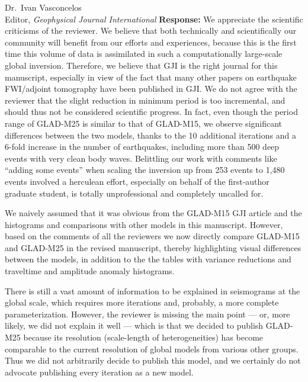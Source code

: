 \documentclass[11pt,a4paper]{letter}
\newcommand{\response}[1]{\textbf{Response:} #1}
\begin{document}
\begin{letter}{Dr.~Ivan Vasconcelos\\
Editor, \textit{Geophysical Journal International}}
\response{We appreciate the scientific criticisms of the reviewer.
We believe that both technically and scientifically our community will benefit from our efforts and experiences, because this is the first time this volume of data is
assimilated in such a computationally large-scale global inversion.
Therefore,
we believe that GJI is the right journal for this manuscript,
especially in view of the fact that many other papers on earthquake FWI/adjoint tomography have been published in GJI.
We do not agree with the reviewer that the slight reduction in minimum period is too incremental, and should thus not be considered scientific progress.
In fact, even though the period range of GLAD-M25 is similar to that of GLAD-M15,
we observe significant differences between the two models,
thanks to the 10 additional iterations and a 6-fold increase in the number of earthquakes,
including more than 500 deep events with very clean body waves.
Belittling our work with comments like ``adding some events'' when scaling the inversion up from 253 events to 1,480 events involved a herculean effort, especially on behalf of the first-author graduate student, is totally unprofessional and completely uncalled for.

We naively assumed that it was obvious from the GLAD-M15 GJI article and the histograms and comparisons with other models in this manuscript.
However, based on the comments of all the reviewers we now directly compare GLAD-M15 and GLAD-M25 in the revised manuscript,
thereby highlighting visual differences between the models, in addition to the the tables with variance reductions and traveltime and amplitude anomaly histograms.

There is still a vast amount of information to be explained in seismograms at the global scale, which requires more iterations and, probably, a more complete parameterization.
However, the reviewer is missing the main point --- or, more likely, we did not explain it well --- which is that we decided to publish GLAD-M25 because its resolution (scale-length of heterogeneities) has become comparable to the current resolution of global models from various other groups.
Thus we did not arbitrarily decide to publish this model,
and we certainly do not advocate publishing every iteration as a new model.

}
\end{letter}
\end{document}
